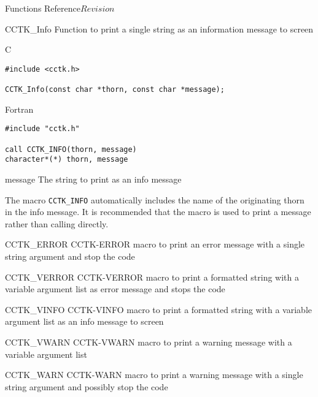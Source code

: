 \begin{cactuspart}{ Functions Reference}{}{$Revision$}
\begin{FunctionDescription}{CCTK\_Info}
\label{CCTK-Info}
Function to print a single string as an information message to screen

\begin{SynopsisSection}
\begin{Synopsis}{C}
\begin{verbatim}
#include <cctk.h>

CCTK_Info(const char *thorn, const char *message);
\end{verbatim}
\end{Synopsis}
\begin{Synopsis}{Fortran}
\begin{verbatim}
#include "cctk.h"

call CCTK_INFO(thorn, message)
character*(*) thorn, message
\end{verbatim}
\end{Synopsis}
\end{SynopsisSection}

\begin{ParameterSection}
\begin{Parameter}{message}
The string to print as an info message
\end{Parameter}
\end{ParameterSection}

\begin{Discussion}
The macro \verb|CCTK_INFO| automatically includes the name of the originating
thorn in the info message. It is recommended that the macro 
is used to print a message rather than calling  directly.
\end{Discussion}

\begin{SeeAlsoSection}
\begin{SeeAlso2} {CCTK\_ERROR} {CCTK-ERROR}
macro to print an error message with a single string argument and stop
the code
\end{SeeAlso2}
\begin{SeeAlso2} {CCTK\_VERROR} {CCTK-VERROR}
macro to print a formatted string with a variable argument list as error
message and stops the code
\end{SeeAlso2}
\begin{SeeAlso2} {CCTK\_VINFO} {CCTK-VINFO}
macro to print a formatted string with a variable argument list as an
info message to screen
\end{SeeAlso2}
\begin{SeeAlso2} {CCTK\_VWARN} {CCTK-VWARN}
macro to print a warning message with a variable argument list
\end{SeeAlso2}
\begin{SeeAlso2} {CCTK\_WARN} {CCTK-WARN}
macro to print a warning message with a single string argument and
possibly stop the code
\end{SeeAlso2}
\end{SeeAlsoSection}


\end{FunctionDescription}
\end{cactuspart}
